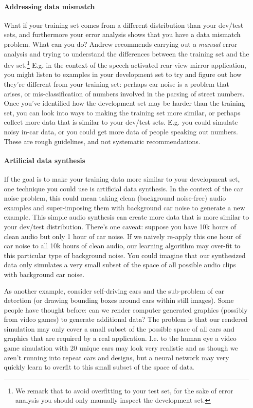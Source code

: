 \documentclass[12pt]{article}
\begin{document}
\paragraph{Addressing data mismatch} What if your training set comes from a different distribution than your dev/test sets, and furthermore your error analysis shows that you have a data mismatch problem. What can you do? Andrew recommends carrying out a \emph{manual} error analysis and trying to understand the differences between the training set and the dev set.\footnote{We remark that to avoid overfitting to your test set, for the sake of error analysis you should only manually inspect the development set.} E.g. in
the context of the speech-activated rear-view mirror application, you might listen to examples in your development set to try
and figure out how they're different from your training set: perhaps car noise is a problem that arises, or mis-classification of
numbers involved in the parsing of street numbers. Once you've identified how the development set may be harder than the training
set, you can look into ways to making the training set more similar, or perhaps collect more data that is similar to your dev/test
sets. E.g. you could simulate noisy in-car data, or you could get more data of people speaking out numbers. 
These are rough guidelines, and not systematic recommendations.

\paragraph{Artificial data synthesis}
If the goal is to make your training data more similar to your development set, one technique you could use is artificial data synthesis. In the context of the car noise problem, this could mean taking clean (background noise-free) audio examples and super-imposing them with background car noise to generate a new example. This simple audio synthesis can create more data that is more similar to your dev/test distribution. There's one caveat: suppose you have 10k hours of clean audio but only 1 hour of car noise. If we naively re-apply this one hour of car noise to all 10k hours of clean audio, our learning algorithm may over-fit to this particular
type of background noise. You could imagine that our synthesized data only simulates a very small subset of the space of all possible audio clips with background car noise.

As another example, consider self-driving cars and the sub-problem of car detection (or drawing bounding boxes around cars within still images). Some people have thought before: can we render computer generated graphics (possibly from video games) to generate additional data? The problem is that our rendered simulation may only cover a small subset of the possible space of all cars and graphics that are required by a real application. I.e. to the human eye a video game simulation with 20 unique cars may look very realistic and as though we aren't running into repeat cars and designs, but a neural network may very quickly learn to overfit to this small subset of the space of data.
\end{document}
